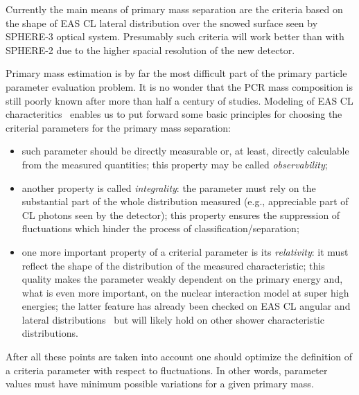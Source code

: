 \documentclass[a4paper,11pt]{article}
\begin{document}
Currently the main means of primary mass separation are the criteria based on the shape of EAS CL lateral distribution over the snowed surface seen by SPHERE-3 optical system. Presumably such criteria will work better than with SPHERE-2 due to the higher spacial resolution of the new detector.

Primary mass estimation is by far the most difficult part of the primary particle parameter evaluation problem. It is no wonder that the PCR mass composition is still poorly known after more than half a century of studies. Modeling of EAS CL characteritics~\cite{Gal18a,Gal18b,Ant09,Ant09b}
enables us to put forward some basic principles for choosing the criterial parameters for the primary mass separation:

\begin{itemize}
\item such parameter should be directly measurable or, at least, directly calculable from the measured quantities; this property may be called {\it observability};

\item another property is called {\it integrality}: the parameter must rely on the substantial part of the whole distribution measured (e.g., appreciable part of CL photons seen by the detector); this property ensures the suppression of fluctuations which hinder the process of classification/separation;

\item one more important property of a criterial parameter is its {\it relativity}: it must reflect the shape of the distribution of the measured characteristic; this quality makes the parameter weakly dependent on the primary energy and, what is even more important, on the nuclear interaction model at super high energies; the latter feature has already been checked on EAS CL angular and lateral distributions~\cite{Gal18a,Gal18b,Ant09,Ant09b} but will likely hold on other shower characteristic distributions.

\end{itemize}
After all these points are taken into account one should optimize the definition of a criteria parameter with respect to fluctuations. In other words, parameter values must have minimum possible variations for a given primary mass.

\end{document}
